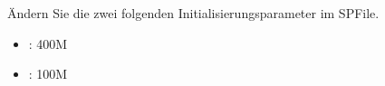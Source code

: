       \item \"Andern Sie die zwei folgenden Initialisierungsparameter im SPFile.
        \begin{itemize}
          \item {}: 400M
          \item {}: 100M
        \end{itemize}
